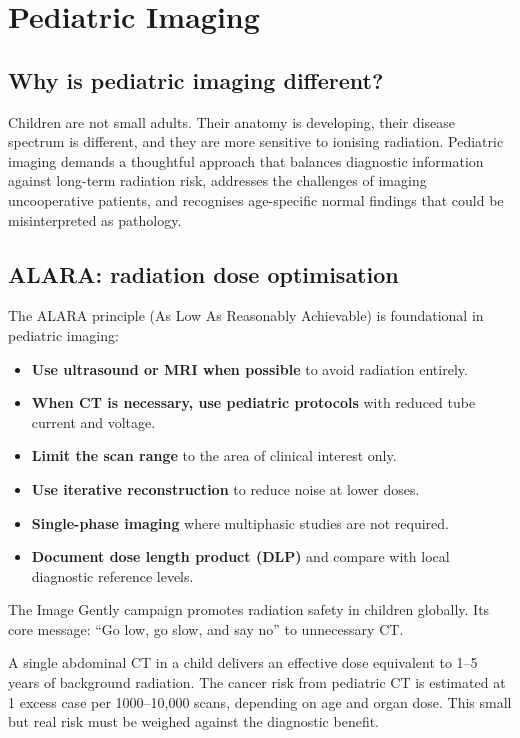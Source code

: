 \chapter{Pediatric Imaging}

\label{ch:ch56_pediatric}

\section{Why is pediatric imaging different?}
Children are not small adults. Their anatomy is developing, their disease spectrum is different, and they are more sensitive to ionising radiation. Pediatric imaging demands a thoughtful approach that balances diagnostic information against long-term radiation risk, addresses the challenges of imaging uncooperative patients, and recognises age-specific normal findings that could be misinterpreted as pathology.

\section{ALARA: radiation dose optimisation}
The ALARA principle (As Low As Reasonably Achievable) is foundational in pediatric imaging:
\begin{itemize}
    \item \textbf{Use ultrasound or MRI when possible} to avoid radiation entirely.
    \item \textbf{When CT is necessary, use pediatric protocols} with reduced tube current and voltage.
    \item \textbf{Limit the scan range} to the area of clinical interest only.
    \item \textbf{Use iterative reconstruction} to reduce noise at lower doses.
    \item \textbf{Single-phase imaging} where multiphasic studies are not required.
    \item \textbf{Document dose length product (DLP)} and compare with local diagnostic reference levels.
\end{itemize}

The Image Gently campaign promotes radiation safety in children globally. Its core message: ``Go low, go slow, and say no'' to unnecessary CT.

\begin{pearlbox}
A single abdominal CT in a child delivers an effective dose equivalent to 1--5 years of background radiation. The cancer risk from pediatric CT is estimated at 1 excess case per 1000--10,000 scans, depending on age and organ dose. This small but real risk must be weighed against the diagnostic benefit.
\end{pearlbox}

